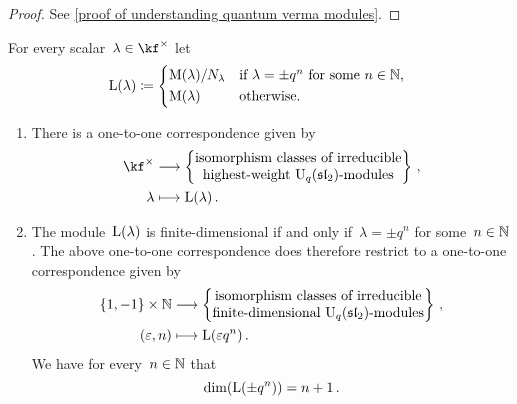 \documentclass[a4paper, 11pt, oneside]{scrartcl}
\begin{document}
\begin{proof}
  See \cref{proof of understanding quantum verma modules}.
\end{proof}

\begin{definition}
  For every scalar~$\lambda \in \kf^\times$ let
  \[
    \irred(\lambda)
    \defined
    \begin{cases*}
        \verma(\lambda) / N_\lambda
        &
        if~$\lambda = \pm q^n$ for some~$n \in \Natural$,
        \\
        \verma(\lambda)
        &
        otherwise.
    \end{cases*}
  \]
\end{definition}

\begin{theorem}
  \leavevmode
  \begin{enumerate}
    \item
      There is a one-to-one correspondence given by
      \begin{align*}
        \kf^\times
        &\longto
        \left\{
          \begin{tabular}{@{}c@{}}
            isomorphism classes of irreducible \\
            highest-weight~\modules{$\Univ_q(\sllie_2)$}
          \end{tabular}
        \right\} \,,
        \\
        \lambda
        &\longmapsto
        \irred(\lambda) \,.
      \end{align*}
    \item
      The module~$\operatorname{L}(\lambda)$ is finite-dimensional if and only if~$\lambda = \pm q^n$ for some~$n \in \mathbb{N}$.
      The above one-to-one correspondence does therefore restrict to a one-to-one correspondence given by
      \begin{align*}
        \{ 1, -1 \} \times \Natural
        &\longto
        \left\{
          \begin{tabular}{@{}c@{}}
            isomorphism classes of irreducible \\
            finite-dimensional~\modules{$\Univ_q(\sllie_2)$}
          \end{tabular}
        \right\} \,,
        \\
        (\varepsilon, n)
        &\longmapsto
        \irred(\varepsilon q^n) \,.
      \end{align*}
      We have for every~$n \in \mathbb{N}$ that
      \[
        \dim(\operatorname{L}(\pm q^n))
        =
        n + 1 \,.
      \]
  \end{enumerate}
\end{theorem}
\end{document}
